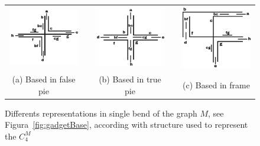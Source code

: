 \begin{figure}[htb]
  \centering
  \begin{tabular}{c c c c c }
    \includegraphics[width=4cm]{./img/falsePie.png}  %
    & &\includegraphics[width=4cm]{./img/truePie.png} %
    & &
 \includegraphics[width=4cm]{./img/frame.png} \\%
    {\footnotesize (a) Based in false pie}  & &  {\footnotesize(b) Based in true pie} & & {\footnotesize (c) Based in frame} %
  \end{tabular}
  \caption{Differents representations in single bend of the  graph $M$, see Figura~\ref{fig:gadgetBase}, according with structure used to represent the $C_4^M$}\label{fig:falsepietruepieframe}
\end{figure} 